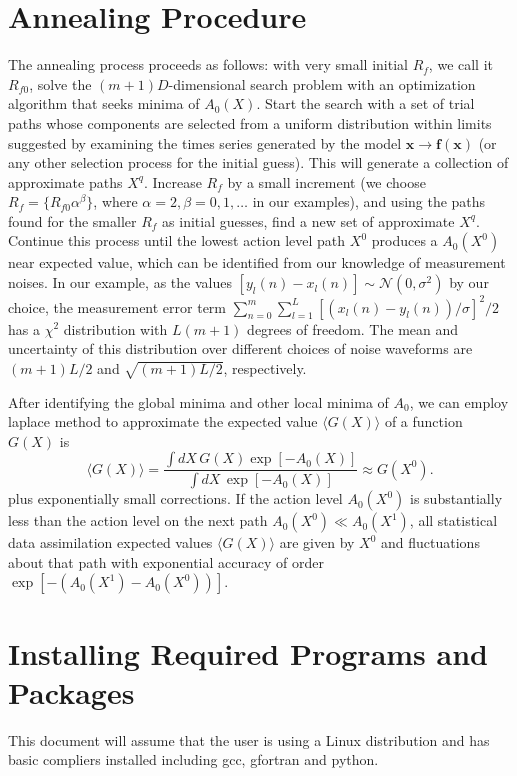 \documentclass[11pt]{article}
\begin{document}
\section{Annealing Procedure}
The annealing process proceeds as follows: with very small initial $R_f$, we call it $R_{f0}$, solve the $(m+1)D$-dimensional search problem with an optimization algorithm that seeks minima of $A_0(X)$. Start the search with a set of trial paths whose components are selected from a uniform distribution within limits suggested by examining the times series generated by the model $\mathbf{x} \to \mathbf{f}(\mathbf{x})$ (or any other selection process for the initial guess). This will generate a collection of approximate paths $X^q$. Increase $R_f$ by a small increment (we choose $R_f = \{R_{f0}\alpha^{\beta}\}$, where $\alpha=2, \beta = 0,1,\dots$ in our examples),  and using the paths found for the smaller $R_f$ as initial guesses, find a new set of approximate $X^q$. Continue this process until the lowest action level path $X^0$ produces a $A_0(X^0)$ near expected value, which can be identified from our knowledge of measurement noises. In our example, as the values $[y_l(n) - x_l(n)]\sim\mathcal{N}(0,\sigma^2)$ by our choice, the measurement error term  $\sum_{n=0}^m \sum_{l=1}^L [(x_l(n) - y_l(n))/\sigma]^2/2$ has a $\chi^2$ distribution with $L(m+1)$ degrees of freedom. The mean and uncertainty of this distribution over different choices of noise waveforms are $(m+1)L/2$ and $\sqrt{(m+1)L/2}$, respectively.

After identifying the global minima and other local minima of $A_0$, we can employ laplace method to approximate the expected value $\langle G(X) \rangle$ of a function $G(X)$ is 
\begin{equation}
\langle G({X}) \rangle = \frac{\int dX\, G(X) \exp[-A_0(X)]}{\int dX\, \exp[-A_0(X)]}\approx G(X^0).
\label{eq:expect}
\end{equation}
plus exponentially small corrections.
If the action level $A_0(X^0)$ is substantially less than the action level on the next path $A_0(X^0) \ll A_0(X^1)$, all statistical data assimilation expected values $\langle G(X)\rangle$ are given by $X^0$ and fluctuations about that path with exponential accuracy of order $\exp[-(A_0(X^1) - A_0(X^0))]$.
\section{Installing Required Programs and Packages}
This document will assume that the user is using a Linux distribution and has basic compliers installed including gcc, gfortran and python.
\end{document}
